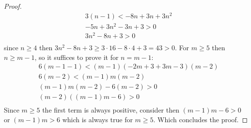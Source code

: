 \begin{proof}
\begin{align*}
		&3(n-1)<-8n+3n+3n^2\\
		&-5n+3n^2-3n+3>0\\
		&3n^2-8n+3>0\\
	\end{align*}
	since $n\geq4$ then $3n^2-8n+3\geq 3 \cdot 16 - 8 \cdot 4+3 =43 > 0$.
	For $m\geq5$ then $n\geq m-1$, so it suffices to prove it for $n=m-1$:
	\begin{align*}
		&6(m-1-1)<(m-1)(-2m+3+3m-3)(m-2)\\
		&6(m-2)<(m-1)m(m-2)\\
		&(m-1)m(m-2)-6(m-2)>0\\
		&(m-2)((m-1)m-6)>0\\
	\end{align*}
	Since $m\geq5$ the first term is always positive, consider then $(m-1)m-6>0$ or $(m-1)m>6$ which is always true for $m\geq5$. Which concludes the proof.
\end{proof}

